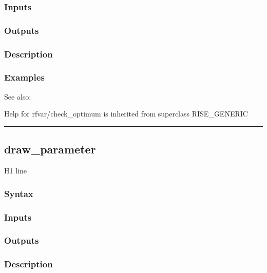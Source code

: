 \documentclass[letterpaper,10pt,english]{sphinxmanual}
\begin{document}
\subsubsection{Inputs}
\label{classes/models/@rfvar/rfvar:id4}

\subsubsection{Outputs}
\label{classes/models/@rfvar/rfvar:id5}

\subsubsection{Description}
\label{classes/models/@rfvar/rfvar:id6}

\subsubsection{Examples}
\label{classes/models/@rfvar/rfvar:id7}
See also:

Help for rfvar/check\_optimum is inherited from superclass RISE\_GENERIC


\bigskip\hrule{}\bigskip



\subsection{draw\_parameter}
\label{classes/models/@rfvar/rfvar:id8}\label{classes/models/@rfvar/rfvar:draw-parameter}
H1 line


\subsubsection{Syntax}
\label{classes/models/@rfvar/rfvar:id9}

\subsubsection{Inputs}
\label{classes/models/@rfvar/rfvar:id10}

\subsubsection{Outputs}
\label{classes/models/@rfvar/rfvar:id11}

\subsubsection{Description}
\label{classes/models/@rfvar/rfvar:id12}
\end{document}
